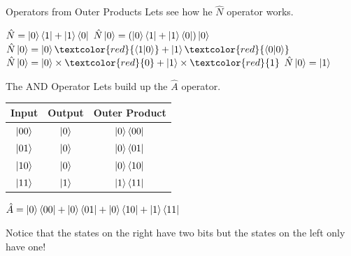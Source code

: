 \documentclass{beamer}
\begin{document}
\begin{frame}{Operators from Outer Products}
    Lets see how he $\hat{N}$ operator works.\vfill
    \begin{center}
        \begin{math}
            \hat{N} = \ket{0}\bra{1} + \ket{1}\bra{0}
        \end{math}
        \vfill
        \begin{math}
            \hat{N}\ket{0} = (\ket{0}\bra{1} + \ket{1}\bra{0})\ket{0}\\
        \end{math}
        \pause
        \vfill
        \begin{math}
            \hat{N}\ket{0} = \ket{0}\textcolor{red}{\bra{1}\ket{0}} + \ket{1}\textcolor{red}{\bra{0}\ket{0}}
        \end{math}
        \pause
        \vfill
        \begin{math}
            \hat{N} \ket{0} = \ket{0}\times \textcolor{red}{0} + \ket{1} \times \textcolor{red}{1}
        \end{math}
        \pause
        \vfill
        \begin{math}
            \hat{N}\ket{0} = \ket{1}
        \end{math}
        
    \end{center}
\end{frame}

\begin{frame}{The AND Operator}
    Lets build up the $\hat{A}$ operator.\vfill
    \begin{center}
        
    \begin{tabular}{| c | c | c |}
        \hline
         Input & Output & Outer Product \\
         \hline
         $\ket{00}$ & $\ket{0}$ & $\ket{0}\bra{00}$\\
         \pause
         $\ket{01}$ & $\ket{0}$ & $\ket{0}\bra{01}$\\
         \pause
         $\ket{10}$ & $\ket{0}$ & $\ket{0}\bra{10}$\\
         \pause
         $\ket{11}$ & $\ket{1}$ & $\ket{1}\bra{11}$\\
         \hline
    \end{tabular}
    \vfill
    \pause
    \begin{math}
        \hat{A} = \ket{0}\bra{00} + \ket{0}\bra{01} + \ket{0}\bra{10} + \ket{1}\bra{11}
    \end{math}
    \end{center}
    \pause
    \vfill
    Notice that the states on the right have two bits but the states on the left only have one!
    
\end{frame}
\end{document}
